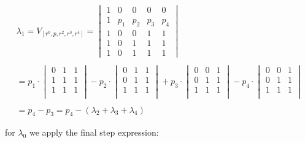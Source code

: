 		\begin{equation}
		\begin{align*}		

		
			
			\lambda_1 =	V_{[r^0,p,r^2,r^3,r^4]} = 
			\begin{vmatrix}
				1 & 0 & 0 & 0 & 0\\ 
				1 & p_{1} &  p_{2}& p_{3} & p_{4}\\
				1 & 0 & 0 & 1 & 1\\ 
				1 &  0  & 1 & 1 & 1 \\ 
				1 & 0 & 1 & 1 & 1
				\end{vmatrix} \\  \\ 
				= p_1 \cdot \begin{vmatrix} 0 & 1 & 1 \\ 1 & 1 & 1 \\ 1 & 1 & 1 \\ \end{vmatrix} - 
				p_2 \cdot \begin{vmatrix} 0 & 1 & 1 \\ 0 & 1 & 1 \\ 1 & 1 & 1 \\ \end{vmatrix} + 
				p_3 \cdot \begin{vmatrix} 0 & 0 & 1 \\0 & 1 & 1 \\ 1 & 1 & 1 \\ \end{vmatrix} - 
				p_4 \cdot \begin{vmatrix} 0 & 0 & 1 \\ 0 & 1 & 1 \\ 1 & 1 & 1 \\ \end{vmatrix} \\ \\ 
				= p_4 - p_3 = p_4 - (\lambda_2 + \lambda_3 + \lambda_4)
		\end{align*}
		\end{equation}
		
		
\break
for $\lambda_0$ we apply the final step expression:
		

